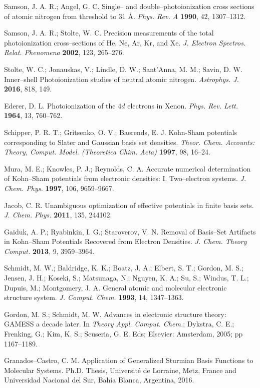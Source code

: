\documentclass[10pt]{article}
\begin{document}
\begin{thebibliography}{10}
Samson, J. A. R.; Angel, G. C.
Single-- and double--photoionization cross sections of atomic nitrogen from threshold to 31 \AA.
{\it Phys. Rev. A} {\bf 1990}, 42, 1307--1312.

Samson, J. A. R.; Stolte, W. C.
Precision measurements of the total photoionization cross--sections of He, Ne, Ar, Kr, and Xe.
{\it J. Electron Spectros. Relat. Phenomena} {\bf 2002}, 123, 265--276.

Stolte, W. C.; Jonauskas, V.; Lindle, D. W.; Sant'Anna, M. M.; Savin, D. W. 
Inner--shell Photoionization studies of neutral atomic nitrogen.
{\it Astrophys. J.} {\bf 2016}, 818, 149.

Ederer, D. L. 
Photoionization of the $4d$ electrons in Xenon.
{\it Phys. Rev. Lett.} {\bf 1964}, 13, 760--762.

Schipper, P. R. T.; Gritsenko, O. V.; Baerends, E. J. 
Kohn-Sham potentials corresponding to Slater and Gaussian basis set densities.
{\it Theor. Chem. Accounts: Theory, Comput. Model. (Theoretica Chim. Acta)} {\bf 1997}, 98, 16--24.

Mura, M. E.; Knowles, P. J.; Reynolds, C. A.
Accurate numerical determination of Kohn--Sham potentials from electronic densities: I. Two--electron systems.
{\it J. Chem. Phys.} {\bf 1997}, 106, 9659--9667.

Jacob, C. R. 
Unambiguous optimization of effective potentials in finite basis sets.
{\it J. Chem. Phys.} {\bf 2011}, 135, 244102.

Gaiduk, A. P.; Ryabinkin, I. G.; Staroverov, V. N.
Removal of Basis--Set Artifacts in Kohn--Sham Potentials Recovered from Electron Densities.
{\it J. Chem. Theory Comput.} {\bf 2013}, 9, 3959--3964.

Schmidt, M. W.; Baldridge, K. K.; Boatz, J. A.; Elbert, S. T.; Gordon, M. S.; Jensen, J. H.; Koseki, S.;
Matsunaga, N.; Nguyen, K. A.; Su, S.; Windus, T. L.; Dupuis, M.; Montgomery, J. A.
General atomic and molecular electronic structure system.
{\it J. Comput. Chem.} {\bf 1993}, 14, 1347--1363.

Gordon, M. S.; Schmidt, M. W.
Advances in electronic structure theory: GAMESS a decade later. 
In {\it Theory Appl. Comput. Chem.}; 
Dykstra, C. E.; Frenking, G.; Kim, K. S.; Scuseria, G. E. Eds;
Elsevier: Amsterdam, 2005; pp 1167--1189.

Granados--Castro, C. M.
Application of Generalized Sturmian Basis Functions to Molecular Systems.
Ph.D. Thesis, Université de Lorraine, Metz, France and 
Universidad Nacional del Sur, Bahía Blanca, Argentina, 2016.


\end{thebibliography}
\end{document}

